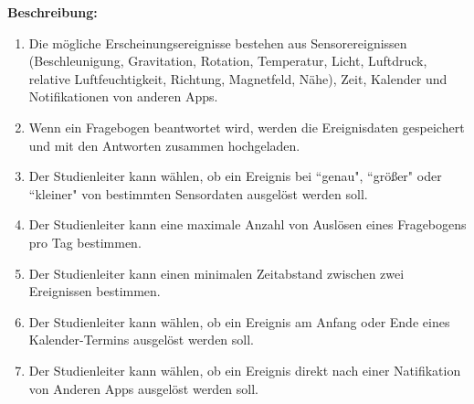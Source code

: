 \documentclass[a4paper]{scrreprt}
\begin{document}
\begin{itemize}
                \par \textbf{Beschreibung: }
                    \begin{enumerate}
                        \item Die mögliche \gls{Erscheinungsereignis}se bestehen aus Sensorereignissen (Beschleunigung, Gravitation, Rotation, Temperatur, Licht, Luftdruck, relative Luftfeuchtigkeit, Richtung, Magnetfeld, Nähe), Zeit, Kalender und Notifikationen von anderen Apps.
                        \item Wenn ein Fragebogen beantwortet wird, werden die Ereignisdaten gespeichert und mit den Antworten zusammen hochgeladen.
                        \item Der \gls{Studienleiter} kann wählen, ob ein Ereignis bei ``genau", ``größer" oder ``kleiner" von bestimmten Sensordaten ausgelöst werden soll.
                        \item Der \gls{Studienleiter} kann eine maximale Anzahl von Auslösen eines Fragebogens pro Tag bestimmen.
                        \item Der \gls{Studienleiter} kann einen minimalen Zeitabstand zwischen zwei Ereignissen bestimmen.
                        \item  Der \gls{Studienleiter} kann wählen, ob ein Ereignis am Anfang oder Ende eines Kalender-Termins ausgelöst werden soll.
                        \item  Der \gls{Studienleiter} kann wählen, ob ein Ereignis direkt nach einer Natifikation von Anderen Apps ausgelöst werden soll.
                    \end{enumerate}



\end{itemize}
\end{document}
